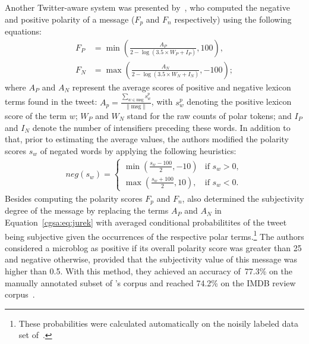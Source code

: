 Another Twitter-aware system was presented by~\citet{Jurek:15}, who
computed the negative and positive polarity of a message ($F_p$ and
$F_n$ respectively) using the following equations: { \small%
  \begin{align}
    F_P &= \min\left(\frac{A_P}{2 - \log(3.5\times W_P + I_P)}, 100\right),\\
    F_N &= \max\left(\frac{A_N}{2 - \log(3.5\times W_N + I_N)}, -100\right);\label{cgsa:eq:jurek}
  \end{align}%
  \normalsize%
}%
where $A_P$ and $A_N$ represent the average scores of positive and
negative lexicon terms found in the tweet:
$A_p = \frac{\sum_{w\in\textrm{msg}}s^p_w}{\lVert\textrm{msg}\rVert}$,
with $s^p_w$ denoting the positive lexicon score of the term $w$;
$W_P$ and $W_N$ stand for the raw counts of polar tokens; and $I_P$
and $I_N$ denote the number of intensifiers preceding these words.  In
addition to that, prior to estimating the average values, the authors
modified the polarity scores $s_w$ of negated words by applying the
following heuristics: { \small%
  \begin{align}
neg(s_w) =
    \begin{cases}
        \min\left(\frac{s_w - 100}{2}, -10\right) & \text{if } s_w > 0,\\
        \max\left(\frac{s_w + 100}{2}, 10\right), & \text{if } s_w < 0.
    \end{cases}
\end{align}%
\normalsize%
}%
Besides computing the polarity scores $F_p$ and $F_n$,
\citeauthor{Jurek:15} also determined the subjectivity degree of the
message by replacing the terms $A_P$ and $A_N$ in
Equation~\ref{cgsa:eq:jurek} with averaged conditional probabilitites
of the tweet being subjective given the occurrences of the respective
polar terms.\footnote{These probabilities were calculated
  automatically on the noisily labeled data set of~\citet{Go:09}.}
The authors considered a microblog as positive if its overall polarity
score was greater than 25 and negative otherwise, provided that the
subjectivity value of this message was higher than 0.5.  With this
method, they achieved an accuracy of~77.3\% on the manually annotated
subset of \citeauthor{Go:09}'s corpus and reached 74.2\% on the IMDB
review corpus~\cite{Maas:11}.

